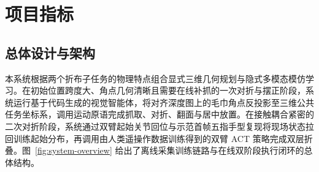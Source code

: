 \section{项目指标}
\label{sec:specs}

\subsection{总体设计与架构}
\label{subsec:overall-arch}

本系统根据两个折布子任务的物理特点组合显式三维几何规划与隐式多模态模仿学习。在初始位置跨度大、角点几何清晰且需要在线补抓的一次对折与摆正阶段，系统运行基于代码生成的视觉智能体，将对齐深度图上的毛巾角点反投影至三维公共任务坐标系，调用运动原语完成抓取、对折、翻面与居中放置。在接触耦合紧密的二次对折阶段，系统通过双臂起始关节回位与示范首帧五指手型复现将现场状态拉回训练起始分布，再调用由人类遥操作数据训练得到的双臂 ACT 策略完成双层折叠。图~\ref{fig:system-overview} 给出了离线采集训练链路与在线双阶段执行闭环的总体结构。

